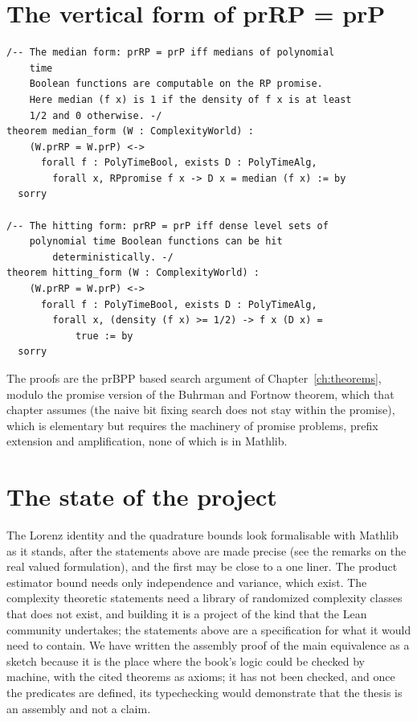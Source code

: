 \section{The vertical form of prRP = prP}

\begin{footnotesize}
\begin{verbatim}
/-- The median form: prRP = prP iff medians of polynomial
    time
    Boolean functions are computable on the RP promise.
    Here median (f x) is 1 if the density of f x is at least
    1/2 and 0 otherwise. -/
theorem median_form (W : ComplexityWorld) :
    (W.prRP = W.prP) <->
      forall f : PolyTimeBool, exists D : PolyTimeAlg,
        forall x, RPpromise f x -> D x = median (f x) := by
  sorry

/-- The hitting form: prRP = prP iff dense level sets of
    polynomial time Boolean functions can be hit
        deterministically. -/
theorem hitting_form (W : ComplexityWorld) :
    (W.prRP = W.prP) <->
      forall f : PolyTimeBool, exists D : PolyTimeAlg,
        forall x, (density (f x) >= 1/2) -> f x (D x) =
            true := by
  sorry
\end{verbatim}
\end{footnotesize}

The proofs are the prBPP based search argument of Chapter~\ref{ch:theorems}, modulo the promise version of the Buhrman and Fortnow theorem, which that chapter assumes (the naive bit fixing search does not stay within the promise), which is elementary but requires the machinery of promise problems, prefix extension and amplification, none of which is in Mathlib.

\section{The state of the project}

The Lorenz identity and the quadrature bounds look formalisable with Mathlib as it stands, after the statements above are made precise (see the remarks on the real valued formulation), and the first may be close to a one liner. The product estimator bound needs only independence and variance, which exist. The complexity theoretic statements need a library of randomized complexity classes that does not exist, and building it is a project of the kind that the Lean community undertakes; the statements above are a specification for what it would need to contain. We have written the assembly proof of the main equivalence as a sketch because it is the place where the book's logic could be checked by machine, with the cited theorems as axioms; it has not been checked, and once the predicates are defined, its typechecking would demonstrate that the thesis is an assembly and not a claim.
